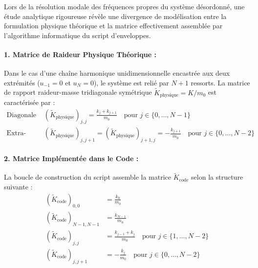 Lors de la résolution modale des fréquences propres du système désordonné, une étude analytique rigoureuse révèle une divergence de modélisation entre la formulation physique théorique et la matrice effectivement assemblée par l'algorithme informatique du script d'enveloppes.

\paragraph{1. Matrice de Raideur Physique Théorique :}
Dans le cas d'une chaîne harmonique unidimensionnelle encastrée aux deux extrémités ($u_{-1} = 0$ et $u_N = 0$), le système est relié par $N+1$ ressorts. La matrice de rapport raideur-masse tridiagonale symétrique $\tilde{K}_{\text{physique}} = K / m_0$ est caractérisée par :
\begin{align}
    \text{Diagonale : } & \left(\tilde{K}_{\text{physique}}\right)_{j,j} = \frac{k_j + k_{j+1}}{m_0} \quad \text{pour } j \in \{0, \dots, N-1\} \\
    \text{Extra-diagonale : } & \left(\tilde{K}_{\text{physique}}\right)_{j, j+1} = \left(\tilde{K}_{\text{physique}}\right)_{j+1, j} = -\frac{k_{j+1}}{m_0} \quad \text{pour } j \in \{0, \dots, N-2\}
\end{align}

\paragraph{2. Matrice Implémentée dans le Code :}
La boucle de construction du script assemble la matrice $\tilde{K}_{\text{code}}$ selon la structure suivante :
\begin{align}
    \left(\tilde{K}_{\text{code}}\right)_{0,0} &= \frac{k_0}{m_0} \\
    \left(\tilde{K}_{\text{code}}\right)_{N-1,N-1} &= \frac{k_{N-1}}{m_0} \\
    \left(\tilde{K}_{\text{code}}\right)_{j,j} &= \frac{k_{j-1} + k_j}{m_0} \quad \text{pour } j \in \{1, \dots, N-2\} \\
    \left(\tilde{K}_{\text{code}}\right)_{j, j+1} &= -\frac{k_j}{m_0} \quad \text{pour } j \in \{0, \dots, N-2\}
\end{align}

